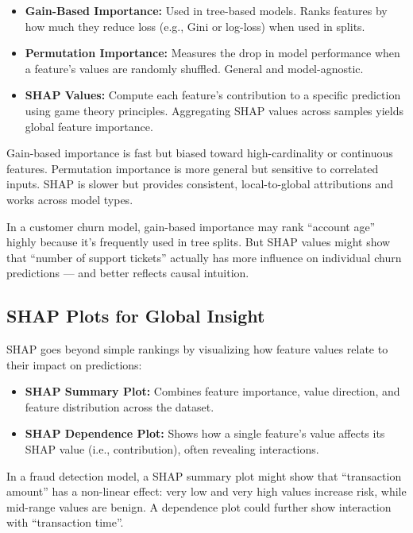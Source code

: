 \documentclass[12pt,openany]{book}
\begin{document}
\begin{itemize}
    \item \textbf{Gain-Based Importance:} Used in tree-based models. Ranks features by how much they reduce loss (e.g., Gini or log-loss) when used in splits.
    \item \textbf{Permutation Importance:} Measures the drop in model performance when a feature’s values are randomly shuffled. General and model-agnostic.
    \item \textbf{SHAP Values:} Compute each feature’s contribution to a specific prediction using game theory principles. Aggregating SHAP values across samples yields global feature importance.
\end{itemize}

\begin{notebox}
Gain-based importance is fast but biased toward high-cardinality or continuous features. Permutation importance is more general but sensitive to correlated inputs. SHAP is slower but provides consistent, local-to-global attributions and works across model types.
\end{notebox}

\begin{examplebox}
In a customer churn model, gain-based importance may rank ``account age'' highly because it's frequently used in tree splits. But SHAP values might show that ``number of support tickets'' actually has more influence on individual churn predictions — and better reflects causal intuition.
\end{examplebox}


\subsection{SHAP Plots for Global Insight}

SHAP goes beyond simple rankings by visualizing how feature values relate to their impact on predictions:

\begin{itemize}
  \item \textbf{SHAP Summary Plot:} Combines feature importance, value direction, and feature distribution across the dataset.
  \item \textbf{SHAP Dependence Plot:} Shows how a single feature’s value affects its SHAP value (i.e., contribution), often revealing interactions.
\end{itemize}

\begin{examplebox}
In a fraud detection model, a SHAP summary plot might show that ``transaction amount'' has a non-linear effect: very low and very high values increase risk, while mid-range values are benign. A dependence plot could further show interaction with ``transaction time''.
\end{examplebox}
\end{document}
